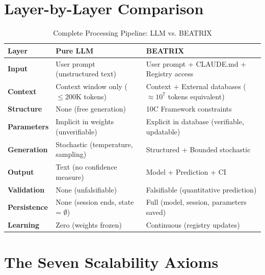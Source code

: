 \section{Layer-by-Layer Comparison}
\label{sec:bx-comparison}

\begin{table}[htbp]
\centering
\caption{Complete Processing Pipeline: LLM vs. BEATRIX}
\label{tab:bx-pipeline}
\renewcommand{\arraystretch}{1.5}
\begin{tabular}{@{}p{2.5cm}p{5cm}p{5.5cm}@{}}
\toprule
\textbf{Layer} & \textbf{Pure LLM} & \textbf{BEATRIX} \\
\midrule
\textbf{Input} &
User prompt (unstructured text) &
User prompt + CLAUDE.md + Registry access \\

\textbf{Context} &
Context window only ($\leq 200$K tokens) &
Context + External databases ($\approx 10^7$ tokens equivalent) \\

\textbf{Structure} &
None (free generation) &
10C Framework constraints \\

\textbf{Parameters} &
Implicit in weights (unverifiable) &
Explicit in database (verifiable, updatable) \\

\textbf{Generation} &
Stochastic (temperature, sampling) &
Structured + Bounded stochastic \\

\textbf{Output} &
Text (no confidence measure) &
Model + Prediction + CI \\

\textbf{Validation} &
None (unfalsifiable) &
Falsifiable (quantitative prediction) \\

\textbf{Persistence} &
None (session ends, state = $\emptyset$) &
Full (model, session, parameters saved) \\

\textbf{Learning} &
Zero (weights frozen) &
Continuous (registry updates) \\
\bottomrule
\end{tabular}
\end{table}


\section{The Seven Scalability Axioms}
\label{sec:bx-axioms}

